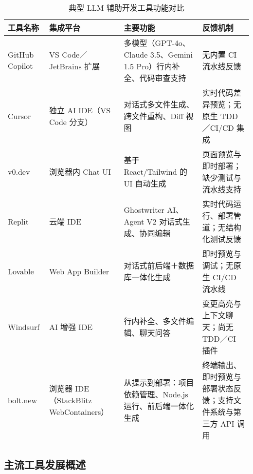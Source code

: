 \begin{table}[htbp]
  \centering
  \footnotesize
  \caption{典型 LLM 辅助开发工具功能对比}
  \label{tab:llm-tools-updated}
  \setlength{\tabcolsep}{3pt}
  \begin{tabular}{
    >{\raggedright\arraybackslash}p{2.4cm}
    >{\raggedright\arraybackslash}p{2.6cm}
    >{\raggedright\arraybackslash}p{3.6cm}
    >{\raggedright\arraybackslash}p{4.6cm}
  }
    \toprule
    \textbf{工具名称} & \textbf{集成平台} & \textbf{主要功能} & \textbf{反馈机制} \\
    \midrule
    GitHub Copilot\cite{copilotx2023}      & VS Code／JetBrains 扩展        & 多模型（GPT-4o、Claude 3.5、Gemini 1.5 Pro）行内补全、代码审查支持      & 无内置 CI 流水线反馈                                \\
    \addlinespace
    Cursor\cite{cursor2025wiki}            & 独立 AI IDE（VS Code 分支）    & 对话式多文件生成、跨文件重构、Diff 视图              & 实时代码差异预览；无原生 TDD／CI/CD 集成            \\
    \addlinespace
    v0.dev\cite{v0dev2024}                 & 浏览器内 Chat UI               & 基于 React/Tailwind 的 UI 自动生成                  & 页面预览与即时部署；缺少测试与流水线支持            \\
    \addlinespace
    Replit\cite{replit2025wiki}            & 云端 IDE                       & Ghostwriter AI、Agent V2 对话式生成、协同编辑       & 实时代码运行、部署管道；无结构化测试反馈            \\
    \addlinespace
    Lovable\cite{lovable2025times}         & Web App Builder                & 对话式前后端＋数据库一体化生成                      & 即时预览与调试；无原生 CI/CD 流水线                \\
    \addlinespace
    Windsurf\cite{windsurf2024}            & AI 增强 IDE                    & 行内补全、多文件编辑、聊天问答                      & 变更高亮与上下文聊天；尚无 TDD／CI 插件            \\
    \addlinespace
    bolt.new\cite{arunachalam2024boltnew,boltnewgithub2024} & 浏览器 IDE（StackBlitz WebContainers） & 从提示到部署：项目依赖管理、Node.js 运行、前后端一体化生成 & 终端输出、即时预览与部署状态反馈；支持文件系统与第三方 API 调用 \\
    \bottomrule
  \end{tabular}
\end{table}

\subsection{主流工具发展概述}

